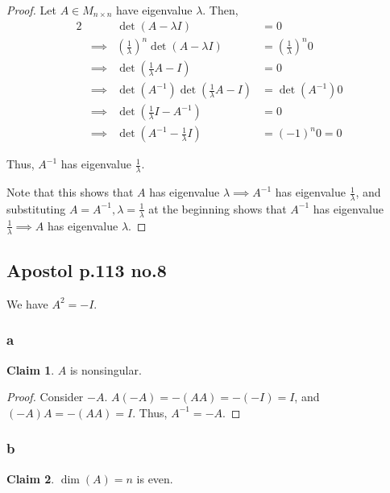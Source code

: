 \documentclass[12pt,letterpaper]{article}
\theoremstyle{definition}
\newtheorem*{claim}{Claim}
\begin{document}
\begin{proof}
  Let $A \in M_{n \times n}$ have eigenvalue $\lambda$. Then, 
  \begin{alignat*}{2}
    && \det(A - \lambda I) &= 0 \\
    &\implies& (\frac{1}{\lambda})^n\det(A - \lambda I) &= (\frac{1}{\lambda})^n 0 \\
    &\implies& \det(\frac{1}{\lambda}A - I) &= 0 \\
    &\implies& \det(A^{-1})\det(\frac{1}{\lambda}A - I) &= \det(A^{-1}) 0\\
    &\implies& \det(\frac{1}{\lambda}I - A^{-1}) &= 0 \\
    &\implies& \det(A^{-1} - \frac{1}{\lambda}I) &= (-1)^n0 = 0
  \end{alignat*}

  Thus, $A^{-1}$ has eigenvalue $\frac{1}{\lambda}$.

  Note that this shows that $A$ has eigenvalue $\lambda \implies A^{-1}$ has
  eigenvalue $\frac{1}{\lambda}$, and substituting $A = A^{-1}, \lambda =
  \frac{1}{\lambda}$ at the beginning shows that $A^{-1}$ has eigenvalue
  $\frac{1}{\lambda} \implies A$ has eigenvalue $\lambda$.
\end{proof}

\subsection*{Apostol p.113 no.8}

We have $A^2 = -I$.

\subsubsection*{a}

\begin{claim}
  $A$ is nonsingular.
\end{claim}

\begin{proof}
  Consider $-A$. $A(-A) = -(AA) = -(-I) = I$, and $(-A)A = -(AA) = I$.
  Thus, $A^{-1} = -A$.
\end{proof}

\subsubsection*{b}

\begin{claim}
  $\dim(A) = n$ is even.
\end{claim}
\end{document}
